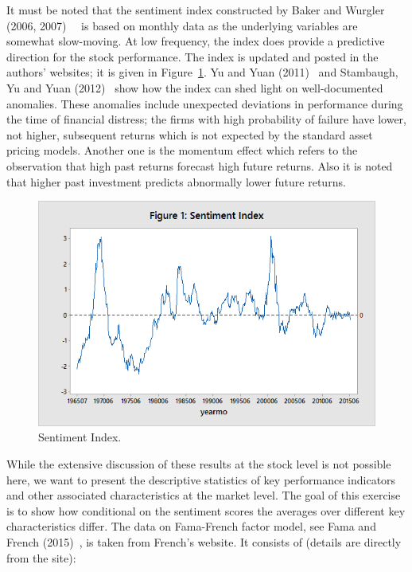  
 It must be noted that the sentiment index constructed by Baker and Wurgler (2006, 2007)~\cite{baker2006investor}~\cite{baker2007investor} is based on monthly data as the underlying variables are somewhat slow-moving. At low frequency, the index does provide a predictive direction for the stock performance. The index is updated and posted in the authors' websites; it is given in Figure~\ref{fig:sentimentindex}. Yu and Yuan (2011)~\cite{yuyuan} and Stambaugh, Yu and Yuan (2012)~\cite{stamb} show how the index can shed light on well-documented anomalies. These anomalies include unexpected deviations in performance during the time of financial distress; the firms with high probability of failure have lower, not higher, subsequent returns which is not expected by the standard asset pricing models. Another one is the momentum effect which refers to the observation that high past returns forecast high future returns. Also it is noted that higher past investment predicts abnormally lower future returns. 
	 \begin{figure}[!ht]
	\centering
	\includegraphics[width=\textwidth]{chapters/chapter_news_an/figures/ch4sec1sentimentindex.png}
	\caption{Sentiment Index.\label{fig:sentimentindex}}
	\end{figure}


While the extensive discussion of these results at the stock level is not possible here, we want to present the descriptive statistics of key performance indicators and other associated characteristics at the market level. The goal of this exercise is to show how conditional on the sentiment scores the averages over different key characteristics differ. The data on Fama-French factor model, see Fama and French (2015)~\cite{fama2015international}, is taken from French's website. It consists of (details are directly from the site):

